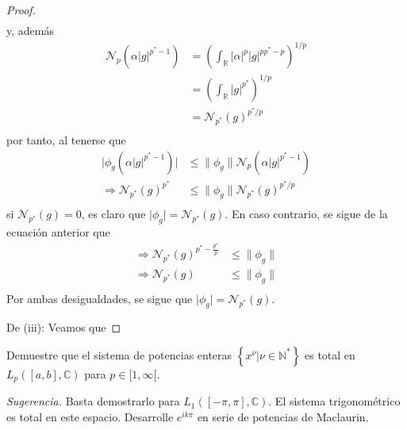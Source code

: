 \documentclass[12pt]{report}
\theoremstyle{largebreak}
\newcommand\abs[1]{\ensuremath{\big|#1\big|}}
\newcommand{\N}[2]{\ensuremath{\mathcal{N}_{#1}\left(#2\right)}}
\begin{document}
\begin{proof}
\begin{equation*}
\begin{split}
            \end{split}
        \end{equation*}
        y, además
        \begin{equation*}
            \begin{split}
                \N{p}{\alpha\abs{g}^{p^*-1}}&=\left(\int_{\mathbb{R}}\abs{\alpha}^p\abs{g}^{pp^*-p} \right)^{1/p}\\
                &=\left(\int_{\mathbb{R}}\abs{g}^{p^*} \right)^{1/p}\\
                &=\N{p^*}{g}^{p^*/p}\\
            \end{split}
        \end{equation*}
        por tanto, al tenerse que
        \begin{equation*}
            \begin{split}
                \abs{\phi_g(\alpha\abs{g}^{p^*-1})}&\leq\|\phi_g\|\N{p}{\alpha\abs{g}^{p^*-1}}\\
                \Rightarrow \N{p^*}{g}^{p^*}&\leq\|\phi_g\|\N{p^*}{g}^{p^*/p}\\
            \end{split}
        \end{equation*}
        si $\N{p^*}{g}=0$, es claro que $\abs{\phi_g}=\N{p^*}{g}$. En caso contrario, se sigue de la ecuación anterior que
        \begin{equation*}
            \begin{split}
                \Rightarrow \N{p^*}{g}^{p^*-\frac{p^*}{p}}&\leq\|\phi_g\|\\
                \Rightarrow \N{p^*}{g}&\leq\|\phi_g\|\\
            \end{split}
        \end{equation*}
        Por ambas desigualdades, se sigue que $\abs{\phi_g}=\N{p^*}{g}$.

        De (iii): Veamos que
        
    \end{proof}

    \begin{excer}
        Demuestre que el sistema de potencias enteras $\left\{x^\nu\Big|\nu\in\mathbb{N}^* \right\}$ es total en $L_p([a,b],\mathbb{C})$ para $p\in[1,\infty[$.

        \textit{Sugerencia.} Basta demostrarlo para $L_1([-\pi,\pi],\mathbb{C})$. El sistema trigonométrico es total en este espacio. Desarrolle $e^{ik\pi}$ en serie de potencias de Maclaurin.
    \end{excer}
\end{document}
